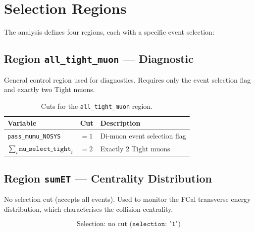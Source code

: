 \documentclass[12pt,a4paper]{article}
\begin{document}
\section{Selection Regions}

The analysis defines four regions, each with a specific event selection:

\subsection{Region \texttt{all\_tight\_muon} --- Diagnostic}

General control region used for diagnostics. Requires only the event
selection flag and exactly two Tight muons.

\begin{table}[h!]
\centering
\caption{Cuts for the \texttt{all\_tight\_muon} region.}
\begin{tabular}{lll}
\toprule
\textbf{Variable} & \textbf{Cut} & \textbf{Description} \\
\midrule
\texttt{pass\_mumu\_NOSYS}                        & $= 1$     & Di-muon event selection flag \\
$\sum_i \texttt{mu\_select\_tight}_i$             & $= 2$     & Exactly 2 Tight muons \\
\bottomrule
\end{tabular}
\end{table}

\subsection{Region \texttt{sumET} --- Centrality Distribution}

No selection cut (accepts all events). Used to monitor the
FCal transverse energy distribution, which characterises the collision
centrality.

\begin{equation}
    \text{Selection: no cut (}\texttt{selection: "1"}\text{)}
\end{equation}
\end{document}
